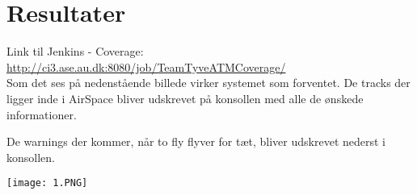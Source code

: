 \section{Resultater}
Link til Jenkins - Coverage: \url{http://ci3.ase.au.dk:8080/job/TeamTyveATMCoverage/} \\
Som det ses på nedenstående billede virker systemet som forventet. De tracks der ligger inde i AirSpace bliver udskrevet på konsollen med alle de ønskede informationer.

De warnings der kommer, når to fly flyver for tæt, bliver udskrevet nederst i konsollen.\newline

\texttt{[image: 1.PNG]}





